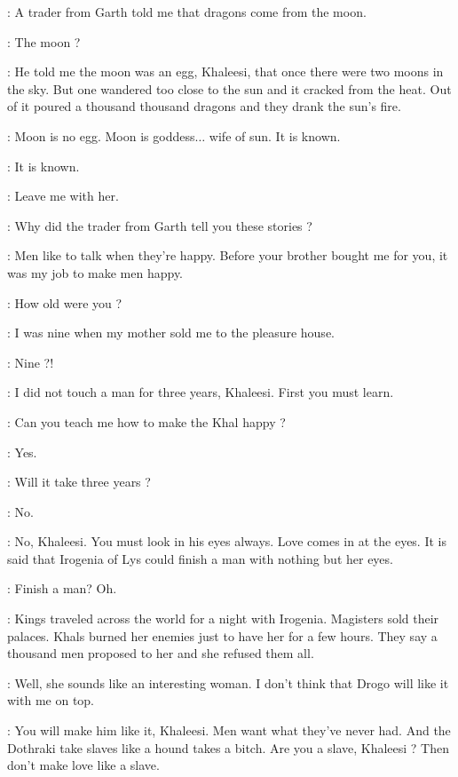 \DOREAH: A trader from Garth told me that dragons come from the moon. 

\DAENERYS: The moon ? 

\DOREAH: He told me the moon was an egg, Khaleesi, that once there were two moons in the sky. But one wandered too close to the sun and it cracked from the heat. Out of it poured a thousand thousand dragons and they drank the sun's fire. 

\IRRI: Moon is no egg. Moon is goddess$\ldots$ wife of sun. It is known. 

\JHIQUI: It is known. 

\DAENERYS: Leave me with her. 


\DAENERYS: Why did the trader from Garth tell you these stories ? 

\DOREAH: Men like to talk when they're happy. Before your brother bought me for you, it was my job to make men happy. 

\DAENERYS: How old were you ? 

\DOREAH: I was nine when my mother sold me to the pleasure house. 

\DAENERYS: Nine ?! 

\DOREAH: I did not touch a man for three years, Khaleesi. First you must learn. 

\DAENERYS: Can you teach me how to make the Khal happy ? 

\DOREAH: Yes. 

\DAENERYS: Will it take three years ? 

\DOREAH: No. 


\DOREAH: No, Khaleesi. You must look in his eyes always. Love comes in at the eyes. It is said that Irogenia of Lys could finish a man with nothing but her eyes. 

\DAENERYS: Finish a man? Oh.

\DOREAH: Kings traveled across the world for a night with Irogenia. Magisters sold their palaces. Khals burned her enemies just to have her for a few hours. They say a thousand men proposed to her and she refused them all. 

\DAENERYS: Well, she sounds like an interesting woman. I don't think that Drogo will like it with me on top. 

\DOREAH: You will make him like it, Khaleesi. Men want what they've never had. And the Dothraki take slaves like a hound takes a bitch. Are you a slave, Khaleesi ? Then don't make love like a slave. 

